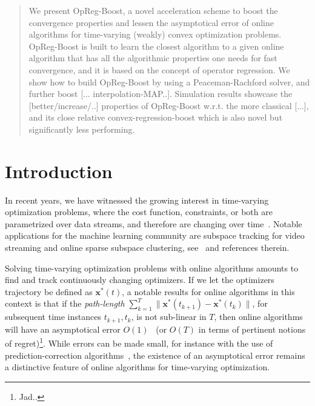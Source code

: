 \documentclass{article}
\newcommand{\x}{\mathbold{x}}
\begin{document}
\printAffiliationsAndNotice{}  %

\begin{abstract}
We present OpReg-Boost, a novel acceleration scheme to boost the convergence properties and lessen the asymptotical error of online algorithms for time-varying (weakly) convex optimization problems. OpReg-Boost is built to learn the closest algorithm to a given online algorithm that has all the algorithmic properties one needs for fast convergence, and it is based on the concept of operator regression. We show how to build OpReg-Boost by using a Peaceman-Rachford solver, and further boost [... interpolation-MAP..]. Simulation results showcase the [better/increase/..] properties of OpReg-Boost w.r.t. the more classical [...], and its close relative convex-regression-boost which is also novel but significantly less performing.  
\end{abstract}


\section{Introduction}\label{sec:introduction}

In recent years, we have witnessed the growing interest in time-varying optimization problems, where the cost function, constraints, or both are parametrized over data streams, and therefore are changing over time~\cite{a bunch}. Notable applications for the machine learning community are subspace tracking for video streaming and online sparse subspace clustering, see~\cite{1,2,3} and references therein. 

Solving time-varying optimization problems with online algorithms amounts to find and track continuously changing optimizers. If we let the optimizers trajectory be defined as $\x^*(t)$, a notable results for online algorithms in this context is that if the \emph{path-length} $\sum_{k=1}^T \|\x^*(t_{k+1}) - \x^*(t_{k})\|$, for subsequent time instances $t_{k+1}, t_k$, is not sub-linear in $T$, then online algorithms will have an asymptotical error $O(1)$~\cite{.,.} (or $O(T)$ in terms of pertinent notions of regret)\footnote{Jad.. }. While errors can be made small, for instance with the use of prediction-correction algorithms~\cite{.,.}, the existence of an asymptotical error remains a distinctive feature of online algorithms for time-varying optimization. 
\end{document}
